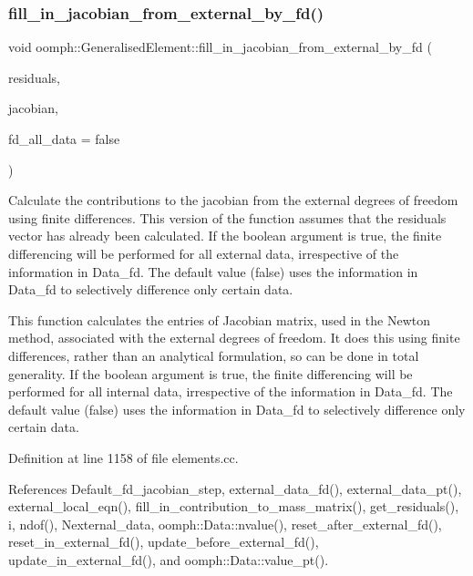 \subsubsection{\texorpdfstring{fill\+\_\+in\+\_\+jacobian\+\_\+from\+\_\+external\+\_\+by\+\_\+fd()}{fill\_in\_jacobian\_from\_external\_by\_fd()}\hspace{0.1cm}{\footnotesize\ttfamily [1/2]}}
{\footnotesize\ttfamily void oomph\+::\+Generalised\+Element\+::fill\+\_\+in\+\_\+jacobian\+\_\+from\+\_\+external\+\_\+by\+\_\+fd (\begin{DoxyParamCaption}\item[{\hyperlink{classoomph_1_1Vector}{Vector}$<$ double $>$ \&}]{residuals,  }\item[{\hyperlink{classoomph_1_1DenseMatrix}{Dense\+Matrix}$<$ double $>$ \&}]{jacobian,  }\item[{const bool \&}]{fd\+\_\+all\+\_\+data = {\ttfamily false} }\end{DoxyParamCaption})\hspace{0.3cm}{\ttfamily [protected]}}



Calculate the contributions to the jacobian from the external degrees of freedom using finite differences. This version of the function assumes that the residuals vector has already been calculated. If the boolean argument is true, the finite differencing will be performed for all external data, irrespective of the information in Data\+\_\+fd. The default value (false) uses the information in Data\+\_\+fd to selectively difference only certain data. 

This function calculates the entries of Jacobian matrix, used in the Newton method, associated with the external degrees of freedom. It does this using finite differences, rather than an analytical formulation, so can be done in total generality. If the boolean argument is true, the finite differencing will be performed for all internal data, irrespective of the information in Data\+\_\+fd. The default value (false) uses the information in Data\+\_\+fd to selectively difference only certain data. 

Definition at line 1158 of file elements.\+cc.



References Default\+\_\+fd\+\_\+jacobian\+\_\+step, external\+\_\+data\+\_\+fd(), external\+\_\+data\+\_\+pt(), external\+\_\+local\+\_\+eqn(), fill\+\_\+in\+\_\+contribution\+\_\+to\+\_\+mass\+\_\+matrix(), get\+\_\+residuals(), i, ndof(), Nexternal\+\_\+data, oomph\+::\+Data\+::nvalue(), reset\+\_\+after\+\_\+external\+\_\+fd(), reset\+\_\+in\+\_\+external\+\_\+fd(), update\+\_\+before\+\_\+external\+\_\+fd(), update\+\_\+in\+\_\+external\+\_\+fd(), and oomph\+::\+Data\+::value\+\_\+pt().



